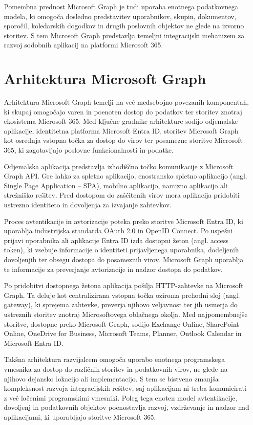 \documentclass[a4paper, 12pt]{book}
\begin{document}
Pomembna prednost Microsoft Graph je tudi uporaba enotnega podatkovnega modela, ki omogoča dosledno predstavitev uporabnikov, skupin, dokumentov, sporočil, koledarskih dogodkov in drugih poslovnih objektov ne glede na izvorno storitev.
S tem Microsoft Graph predstavlja temeljni integracijski mehanizem za razvoj sodobnih aplikacij na platformi Microsoft 365.

\section{Arhitektura Microsoft Graph}

Arhitektura Microsoft Graph temelji na več medsebojno povezanih komponentah, ki skupaj omogočajo varen in poenoten dostop do podatkov ter storitev znotraj ekosistema Microsoft 365.
Med ključne gradnike arhitekture sodijo odjemalske aplikacije, identitetna platforma Microsoft Entra ID, storitev Microsoft Graph kot osrednja vstopna točka za dostop do virov ter posamezne storitve Microsoft 365, ki zagotavljajo poslovne funkcionalnosti in podatke.

Odjemalska aplikacija predstavlja izhodiščno točko komunikacije z Microsoft Graph API. Gre lahko za spletno aplikacijo, enostransko spletno aplikacijo (angl. Single Page Application – SPA), mobilno aplikacijo, namizno aplikacijo ali strežniško rešitev. Pred dostopom do zaščitenih virov mora aplikacija pridobiti ustrezno identiteto in dovoljenja za izvajanje zahtevkov.

Proces avtentikacije in avtorizacije poteka preko storitve Microsoft Entra ID, ki uporablja industrijska standarda OAuth 2.0 in OpenID Connect. Po uspešni prijavi uporabnika ali aplikacije Entra ID izda dostopni žeton (angl. access token), ki vsebuje informacije o identiteti prijavljenega uporabnika, dodeljenih dovoljenjih ter obsegu dostopa do posameznih virov.
Microsoft Graph uporablja te informacije za preverjanje avtorizacije in nadzor dostopa do podatkov.

Po pridobitvi dostopnega žetona aplikacija pošilja HTTP-zahtevke na Microsoft Graph.
Ta deluje kot centralizirana vstopna točka oziroma prehodni sloj (angl. gateway), ki sprejema zahtevke, preverja njihovo veljavnost ter jih usmerja do ustreznih storitev znotraj Microsoftovega oblačnega okolja.
Med najpomembnejše storitve, dostopne preko Microsoft Graph, sodijo Exchange Online, SharePoint Online, OneDrive for Business, Microsoft Teams, Planner, Outlook Calendar in Microsoft Entra ID.

Takšna arhitektura razvijalcem omogoča uporabo enotnega programskega vmesnika za dostop do različnih storitev in podatkovnih virov, ne glede na njihovo dejansko lokacijo ali implementacijo.
S tem se bistveno zmanjša kompleksnost razvoja integracijskih rešitev, saj aplikacijam ni treba komunicirati z več ločenimi programskimi vmesniki.
Poleg tega enoten model avtentikacije, dovoljenj in podatkovnih objektov poenostavlja razvoj, vzdrževanje in nadzor nad aplikacijami, ki uporabljajo storitve Microsoft 365.
\end{document}
